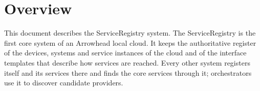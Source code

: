\documentclass[a4paper]{arrowhead}
\begin{document}
\sloppy

\ArrowheadSetup

\begin{center}
  \vspace*{1cm}
  \huge{\arrowtitle}

  \vspace*{0.2cm}
  \LARGE{\arrowtype}
  \vspace*{1cm}

  \vspace*{\fill}


  \vspace*{1cm}
  \vspace*{\fill}

  \begin{abstract}
    This document describes the ServiceRegistry core system of the Eclipse Arrowhead 5.2.2 framework, as implemented in Java Spring in \texttt{ah5-core-java-spring/serviceregistry}, including the local extensions of this workspace.
  \end{abstract}

  \vspace*{1cm}
\end{center}

\newpage

\tableofcontents
\newpage

\section{Overview}
\label{sec:overview}

This document describes the ServiceRegistry system. The ServiceRegistry is the first core system of an Arrowhead local cloud. It keeps the authoritative register of the devices, systems and service instances of the cloud and of the interface templates that describe how services are reached. Every other system registers itself and its services there and finds the core services through it; orchestrators use it to discover candidate providers.
\end{document}

